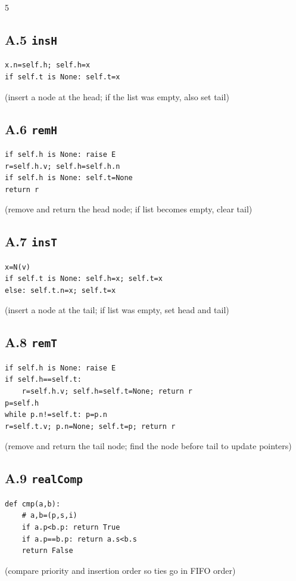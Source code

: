 \documentclass[6pt,landscape]{article}
\begin{document}
\begin{multicols}{5}
\subsection{A.5 \texttt{insH}}\label{code:A5}
\begin{verbatim}
x.n=self.h; self.h=x
if self.t is None: self.t=x
\end{verbatim}
(insert a node at the head; if the list was empty, also set tail)

\subsection{A.6 \texttt{remH}}\label{code:A6}
\begin{verbatim}
if self.h is None: raise E
r=self.h.v; self.h=self.h.n
if self.h is None: self.t=None
return r
\end{verbatim}
(remove and return the head node; if list becomes empty, clear tail)

\subsection{A.7 \texttt{insT}}\label{code:A7}
\begin{verbatim}
x=N(v)
if self.t is None: self.h=x; self.t=x
else: self.t.n=x; self.t=x
\end{verbatim}
(insert a node at the tail; if list was empty, set head and tail)

\subsection{A.8 \texttt{remT}}\label{code:A8}
\begin{verbatim}
if self.h is None: raise E
if self.h==self.t:
    r=self.h.v; self.h=self.t=None; return r
p=self.h
while p.n!=self.t: p=p.n
r=self.t.v; p.n=None; self.t=p; return r
\end{verbatim}
(remove and return the tail node; find the node before tail to update pointers)

\subsection{A.9 \texttt{realComp}}\label{code:A9}
\begin{verbatim}
def cmp(a,b):
    # a,b=(p,s,i)
    if a.p<b.p: return True
    if a.p==b.p: return a.s<b.s
    return False
\end{verbatim}
(compare priority and insertion order so ties go in FIFO order)


\end{multicols}
\end{document}
